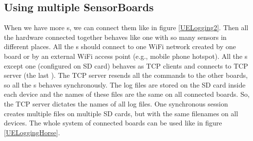 \subsection{Using multiple SensorBoards}
When we have more s, we can connect them like in figure \ref{UELogging2}. Then all the hardware connected together behaves like one  with so many sensors in different places. All the s should connect to one WiFi network created by one board or by an external WiFi access point (e.g., mobile phone hotspot). All the s except one (configured on SD card) behaves as \ac{TCP} clients and connects to \ac{TCP} server (the last ). The \ac{TCP} server resends all the commands to the other boards, so all the s behaves synchronously. The log files are stored on the SD card inside each device and the names of these files are the same on all connected boards. So, the \ac{TCP} server dictates the names of all log files. One synchronous session creates multiple files on multiple SD cards, but with the same filenames on all devices. The whole system of connected boards can be used like in figure \ref{UELoggingHorse}.
